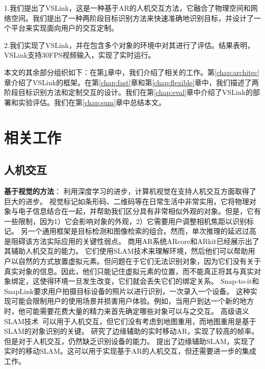 1.我们提出了VSLink，这是一种基于AR的人机交互方法，它融合了物理空间和网络空间。我们提出了一种两阶段目标识别方法来快速准确地识别目标，并设计了一个平台来实现面向用户的交互定制。

2.我们实现了VSLink，并在包含多个对象的环境中对其进行了评估。结果表明，VSLink支持30FPS视频输入，实现了实时运行。

本文的其余部分组织如下：在第\ref{chap:related}章中，我们介绍了相关的工作。第\ref{chap:architec}章介绍了VSLink的框架。在第\ref{chap:fast}章和第\ref{chap:flexible}章中，我们描述了两阶段目标识别方法和定制交互的设计。我们在第\ref{chap:eval}章中介绍了VSLink的部署和实验评估。我们在第\ref{chap:sum}章中总结本文。



\chapter{相关工作}
\label{chap:related}
\section{人机交互}

\textbf{基于视觉的方法}：
利用深度学习的进步，计算机视觉在支持人机交互方面取得了巨大的进步。
视觉标记\cite{wang2010design,olson2011apriltag}如条形码、二维码等在日常生活中非常实用，它将物理对象与电子信息结合在一起，并帮助我们区分具有非常相似外观的对象。但是，它有一些限制，因为1）它会影响对象的外观，2）它需要用户调整相机焦距以识别标记。
另一个通用框架是目标检测\cite{ren2015faster,redmon2018yolov3,qin2019thundernet}和图像检索\cite{philbin2008lost,zheng2017sift}的组合。然而，单次推理的延迟过高是阻碍该方法实际应用的关键性弱点。
商用AR系统ARcore\cite{arcore}和ARkit\cite{arkit}已经展示出了其辅助人机交互的能力。
它们使用SLAM技术来理解环境，然后他们可以帮助用户以自然的方式放置虚拟元素。但问题在于它们无法识别对象，因为它们没有关于真实对象的信息。因此，他们只能记住虚拟元素的位置，而不能真正将其与真实对象绑定，这使得环境一旦发生改变，它们就会丢失它们的绑定关系。
Snap-to-it\cite{de2016snap}和SnapLink\cite{chen2018snaplink}要求用户拍摄目标设备的照片以进行识别，一次录入一个设备。
这种实现可能会限制用户的使用场景并损害用户体验。例如，当用户到达一个新的地方时，他可能需要花费大量的精力来首先确定哪些对象可以与之交互。
高级语义SLAM技术~\cite{strecke2019fusion,runz2018maskfusion,salas2013slam++}可以用于人机交互，但它们没有考虑到地图重用，而地图重用是基于SLAM的对象识别的关键。
\cite{liu2019edge}研究了边缘辅助的实时移动AR，实现了较高的帧率。但是对于人机交互，\cite{liu2019edge}仍然缺乏识别设备的能力。
\cite{ben2020edge,xu2020edge,liu2021edgesharing}提出了边缘辅助SLAM，实现了实时的移动SLAM。这可以用于实现基于AR的人机交互，但还需要进一步的集成工作。

